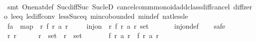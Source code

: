 \begin{isabellebody}
\ \ \ \ \isamarkupfalse%
\ {\isacharparenleft}smt\ One{\isacharunderscore}nat{\isacharunderscore}def\ Suc{\isacharunderscore}diff{\isacharunderscore}Suc\ Suc{\isacharunderscore}leD\ cancel{\isacharunderscore}comm{\isacharunderscore}monoid{\isacharunderscore}add{\isacharunderscore}class{\isachardot}diff{\isacharunderscore}cancel\ diff{\isacharunderscore}zero\ le{\isacharunderscore}{}{\isacharunderscore}eq\ le{\isacharunderscore}diff{\isacharunderscore}conv\ less{\isacharunderscore}Suc{\isacharunderscore}eq\ min{\isachardot}cobounded{}\ min{\isacharunderscore}def\ nat{\isacharunderscore}less{\isacharunderscore}le{\isacharparenright}\isanewline
\isanewline
\ \ \isamarkupfalse%
\ {\isacharquery}fa\ {\isacharequal}\ {\isachardoublequoteopen}map\ {\isacharparenleft}{\isasymlambda}\ r{\isachardot}\ f\ r\ {\isacharparenleft}a\ r{\isacharparenright}{\isacharparenright}\ {\isacharbrackleft}{}{\isachardot}{\isachardot}{\isacharless}{}{}{}{}{\isacharbrackright}{\isachardoublequoteclose}\isanewline
\isanewline
\ \ \isamarkupfalse%
\ {\isachardoublequoteopen}inj{\isacharunderscore}on\ {\isacharparenleft}{\isasymlambda}\ r{\isachardot}\ f\ r\ {\isacharparenleft}a\ r{\isacharparenright}{\isacharparenright}\ {\isacharparenleft}set\ {\isacharbrackleft}{}{\isachardot}{\isachardot}{\isacharless}{}{}{}{}{\isacharbrackright}{\isacharparenright}{\isachardoublequoteclose}\isanewline
\ \ \ \ \isamarkupfalse%
\ inj{\isacharunderscore}on{\isacharunderscore}def\isanewline
\ \ \isamarkupfalse%
\ safe\isanewline
\ \ \ \ \isamarkupfalse%
\ r{}\ r{}\isanewline
\ \ \ \ \isamarkupfalse%
\ {\isachardoublequoteopen}r{}\ {\isasymin}\ set\ {\isacharbrackleft}{}{\isachardot}{\isachardot}{\isacharless}{}{}{}{}{\isacharbrackright}{\isachardoublequoteclose}\ {\isachardoublequoteopen}r{}\ {\isasymin}\ set\ {\isacharbrackleft}{}{\isachardot}{\isachardot}{\isacharless}{}{}{}{}{\isacharbrackright}{\isachardoublequoteclose}\isanewline
\ \ \ \ \ \ {\isachardoublequoteopen}f\ r{}\ {\isacharparenleft}a\ r{}{\isacharparenright}\ {\isacharequal}\ f\ r{}\ {\isacharparenleft}a\ r{}{\isacharparenright}{\isachardoublequoteclose}\isanewline

\end{isabellebody}

